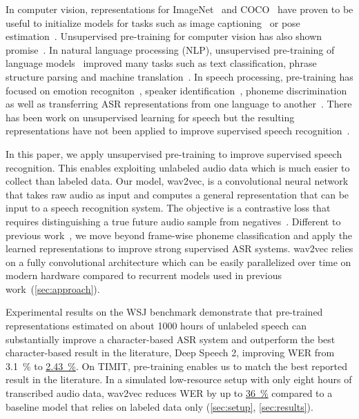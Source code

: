 \documentclass{article} \pdfoutput=1
\newcommand{\wav}{wav2vec}
\newcommand{\fullwsjresult}{\hyperref[tbl:wsj-results]{{\SI{2.43}{\percent}}}}
\newcommand{\lowresourceresult}{\hyperref[fig:low-resource]{{\SI{36}{\percent}}}}
\begin{document}
In computer vision, representations for ImageNet~\citep{deng2009imagenet} and COCO~\citep{lin2014microsoft} have proven to be useful to initialize models for tasks such as image captioning~\citep{vinyals2016show} or pose estimation~\citep{pavllo2019cvpr}. 
Unsupervised pre-training for computer vision has also shown promise~\citep{doersch2015unsup,oord2019cpc}.
In natural language processing (NLP), unsupervised pre-training of language models~\citep{devlin2018bert,radford2018unsup,baevski2019cloze} improved many tasks such as text classification, phrase structure parsing and machine translation~\citep{edunov2019pretrain,lample2019cross}.
In speech processing, pre-training has focused on emotion recogniton~\citep{lian2018emotion}, speaker identification~\citep{ravanelli2018mutual}, phoneme discrimination~\citep{synnaeve2016coherence,oord2018cpc} as well as transferring ASR representations from one language to another~\citep{kunze2017transfer}.
There has been work on unsupervised learning for speech but the resulting representations have not been applied to improve supervised speech recognition~\citep{synnaeve2016temporal,kamper2017seg,chung2018unsup,chen2018unsup,chorowski2019unsup}.

In this paper, we apply unsupervised pre-training to improve supervised speech recognition.
This enables exploiting unlabeled audio data which is much easier to collect than labeled data.
Our model, \wav{}, is a convolutional neural network that takes raw audio as input and computes a general representation that can be input to a speech recognition system.
The objective is a contrastive loss that requires distinguishing a true future audio sample from negatives~\citep{collobert2011jmlr,mikolov2013word2vec,oord2018cpc}.
Different to previous work~\citep{oord2018cpc}, we move beyond frame-wise phoneme classification and apply the learned representations to improve strong supervised ASR systems. 
\wav{} relies on a fully convolutional architecture which can be easily parallelized over time on modern hardware compared to recurrent models used in previous work~(\textsection\ref{sec:approach}).

Experimental results on the WSJ benchmark demonstrate that pre-trained representations estimated on about \num{1000} hours of unlabeled speech can substantially improve a character-based ASR system and outperform the best character-based result in the literature, Deep Speech 2, improving WER from \SI{3.1}{\percent} to \fullwsjresult{}.
On TIMIT, pre-training enables us to match the best reported result in the literature.
In a simulated low-resource setup with only eight hours of transcribed audio data, \wav{} reduces WER by up to \lowresourceresult{} compared to a baseline model that relies on labeled data only (\textsection\ref{sec:setup}, \textsection\ref{sec:results}).
\end{document}
